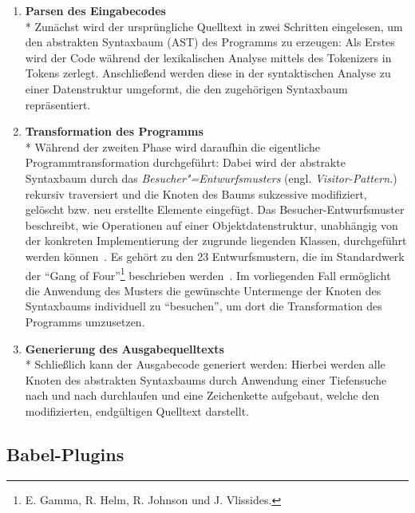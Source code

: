 \begin{enumerate}
  \item \textbf{Parsen des Eingabecodes}\\*
    Zunächst wird der ursprüngliche Quelltext in zwei Schritten eingelesen, um den abstrakten Syntaxbaum (AST) des Programms zu erzeugen: Als Erstes wird der Code während der lexikalischen Analyse mittels des Tokenizers in Tokens zerlegt. Anschließend werden diese in der syntaktischen Analyse zu einer Datenstruktur umgeformt, die den zugehörigen Syntaxbaum repräsentiert.
    \\

  \item \textbf{Transformation des Programms}\\*
    Während der zweiten Phase wird daraufhin die eigentliche Programmtransformation durchgeführt: Dabei wird der abstrakte Syntaxbaum durch das \textit{Besucher"=Entwurfsmusters} (engl. \textit{Visitor-Pattern.}) rekursiv traversiert und die Knoten des Baums sukzessive modifiziert, gelöscht bzw. neu erstellte Elemente eingefügt. Das Besucher-Entwurfsmuster beschreibt, wie Operationen auf einer Objektdatenstruktur, unabhängig von der konkreten Implementierung der zugrunde liegenden Klassen, durchgeführt werden können~\autocite[634\psq]{Freeman:2004}.
    Es gehört zu den 23 Entwurfsmustern, die im Standardwerk  der \enquote{Gang of Four}\footnote{E. Gamma, R. Helm, R. Johnson und J. Vlissides.} beschrieben werden~\autocite[306\psqq]{GAMMA:1994}. Im vorliegenden Fall ermöglicht die Anwendung des Musters die gewünschte Untermenge der Knoten des Syntaxbaums individuell zu \enquote{besuchen}, um dort die Transformation des Programms umzusetzen.
    \\

  \item \textbf{Generierung des Ausgabequelltexts}\\*
    Schließlich kann der Ausgabecode generiert werden: Hierbei werden alle Knoten des abstrakten Syntaxbaums durch Anwendung einer Tiefensuche nach und nach durchlaufen und eine Zeichenkette aufgebaut, welche den modifizierten, endgültigen Quelltext darstellt.
\end{enumerate}

\subsection{Babel-Plugins}
\label{subsection:babel-plugins}

